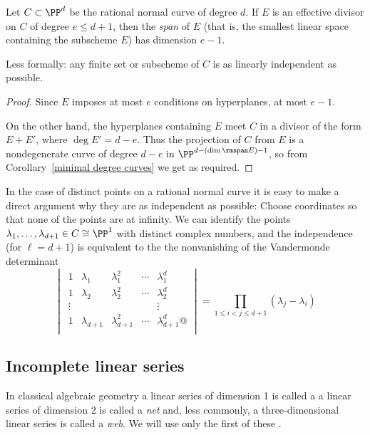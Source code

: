 \begin{corollary}\label{independence of points on a RNC}
Let $C\subset \PP^d$ be the rational normal curve of degree $d$. If $E$ is an effective divisor on $C$ of degree $e\leq d+1$, then the
\emph{span} of $E$ (that is, the smallest linear space containing the subscheme $E$) has dimension $e-1$.
\end{corollary}

Less formally: any finite set or subscheme of $C$ is as linearly independent as possible.

\begin{proof}
Since $E$  
imposes at most $e$ conditions on hyperplanes, 
at most $e-1$.

On the other hand, the hyperplanes containing $E$ meet $C$ in a divisor of the form $E+E'$, where
$\deg E' = d-e$. Thus the projection of $C$ from $E$ is a nondegenerate curve of degree $d-e$ in $\PP^{d-(\dim \rmspan E)-1}$,
so from Corollary~\ref{minimal degree curves} we get 
as required.
\end{proof}

In the case of distinct points on a rational normal curve
it is easy to make a direct argument why they are as independent as possible: Choose coordinates so that none of the points are
at infinity. We can identify the points $\lambda_1,\dots,\lambda_{d+1} \in C \cong \PP^1$ with distinct complex numbers, and the independence (for $\ell = d+1$) is equivalent to the the nonvanishing of the Vandermonde determinant
$$
\begin{vmatrix}
\,1 & \lambda_1 & \lambda_1^2 & \cdots & \!\lambda_1^d \\
\,1 & \lambda_2 & \lambda_2^2 & \cdots & \!\lambda_2^d \\
\,\vdots & & & & \!\vdots \\
\,1 & \lambda_{d+1} & \lambda_{d+1}^2 & \cdots & \lambda_{d+1}^d@ \\
\end{vmatrix}
= \prod_{1 \leq i < j \leq d+1} (\lambda_j - \lambda_i)
$$


\subsection*{Incomplete linear series}

In classical algebraic geometry a linear series of dimension 1 is
called a 
%
a linear series of dimension 2 is called a
\emph{net} and, less commonly, a three-dimensional linear series is
called a \emph{web}.  We will use only the first of these
.

